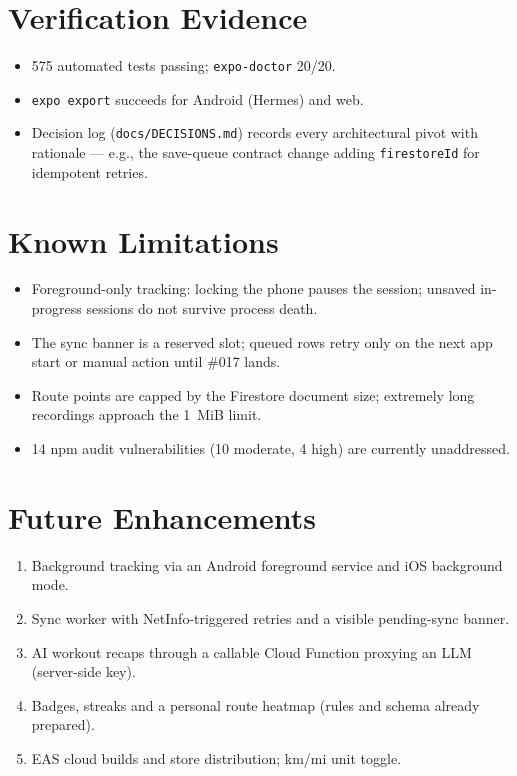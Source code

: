 \documentclass[11pt,a4paper]{report}
\begin{document}
\section{Verification Evidence}
\begin{itemize}[nosep]
    \item 575 automated tests passing; \texttt{expo-doctor} 20/20.
    \item \texttt{expo export} succeeds for Android (Hermes) and web.
    \item Decision log (\texttt{docs/DECISIONS.md}) records every architectural pivot with rationale --- e.g., the save-queue contract change adding \texttt{firestoreId} for idempotent retries.
\end{itemize}

\section{Known Limitations}
\begin{itemize}[nosep]
    \item Foreground-only tracking: locking the phone pauses the session; unsaved in-progress sessions do not survive process death.
    \item The sync banner is a reserved slot; queued rows retry only on the next app start or manual action until \#017 lands.
    \item Route points are capped by the Firestore document size; extremely long recordings approach the 1~MiB limit.
    \item 14 npm audit vulnerabilities (10 moderate, 4 high) are currently unaddressed.
\end{itemize}

\section{Future Enhancements}
\begin{enumerate}[nosep]
    \item Background tracking via an Android foreground service and iOS background mode.
    \item Sync worker with NetInfo-triggered retries and a visible pending-sync banner.
    \item AI workout recaps through a callable Cloud Function proxying an LLM (server-side key).
    \item Badges, streaks and a personal route heatmap (rules and schema already prepared).
    \item EAS cloud builds and store distribution; km/mi unit toggle.
\end{enumerate}
\end{document}
